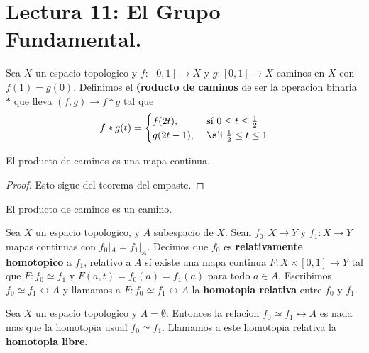 \section*{Lectura 11: El Grupo Fundamental.}

\begin{definition}
    Sea $X$ un espacio topologico y  $f:[0,1] \xrightarrow{} X$ y $g:[0,1]
    \xrightarrow{} X$ caminos en $X$ con  $f(1)=g(0)$. Definimos el
    \textbf{(roducto de caminos} de ser la operacion binaria $\ast$ que lleva
    $(f,g) \xrightarrow{} f \ast g$ tal que
    \begin{equation*}
        f \ast g(t)=\begin{cases}
                f(2t), & \text{ s\'i } 0 \leq t \leq \frac{1}{2}    \\
                g(2t-1), & \text{ \s'i } \frac{1}{2} \leq t \leq 1  \\
            \end{cases}
    \end{equation*}
\end{definition}

\begin{lemma}\label{11.31}
    El producto de caminos es una mapa continua.
\end{lemma}
\begin{proof}
    Esto sigue del teorema del empaste.
\end{proof}
\begin{corollary}
    El producto de caminos es un camino.
\end{corollary}

\begin{definition}
    Sea $X$ un espacio topologico, y  $A$ subespacio de  $X$. Sean  $f_0:X
    \xrightarrow{} Y$ y $f_1:X \xrightarrow{} Y$ mapas continuas con
    $f_0|_A=f_1|_A$. Decimos que $f_0$ es \textbf{relativamente homotopico} a
    $f_1$, relativo a $A$ s\'i existe una mapa continua $F:X \times [0,1]
    \xrightarrow{} Y$ tal que $F:f_0 \simeq f_1$ y $F(a,t)=f_0(a)=f_1(a)$ para
    todo $a \in A$. Escribimos  $f_0 \simeq f_1 \rel{A}$ y llamamos a $F:f_0
    \simeq f_1 \rel{A}$ la \textbf{homotopia relativa} entre $f_0$ y $f_1$.
\end{definition}

\begin{example}\label{}
    Sea $X$ un espacio topologico y  $A=\emptyset$. Entonces la relacion  $f_0
    \simeq f_1 \rel{A}$ es nada mas que la homotopia usual $f_0 \simeq f_1$.
    Llamamos a este homotopia relativa la \textbf{homotopia libre}.
\end{example}

